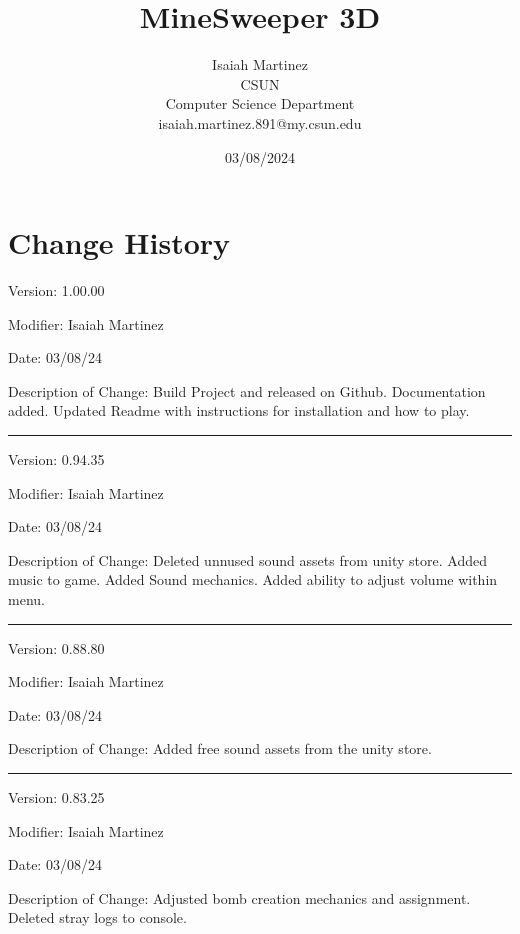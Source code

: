 \documentclass[a4paper,10pt]{article}
\begin{document}
    \title{MineSweeper 3D}

    \author{Isaiah Martinez \\ CSUN \\ Computer Science Department \\ isaiah.martinez.891@my.csun.edu}
          
    \date{03/08/2024}

    \maketitle
   
    \tableofcontents

    \newpage

    \section{Change History}

    Version: 1.00.00

    Modifier: Isaiah Martinez
    
    Date: 03/08/24
    
    Description of Change: Build Project and released on Github.
    Documentation added.
    Updated Readme with instructions for installation and how to play.
 
    \noindent\rule{12cm}{0.4pt}

    Version: 0.94.35

    Modifier: Isaiah Martinez
    
    Date: 03/08/24
    
    Description of Change: Deleted unnused sound assets from unity store.
    Added music to game.
    Added Sound mechanics.
    Added ability to adjust volume within menu.
 
    \noindent\rule{12cm}{0.4pt}

    Version: 0.88.80

    Modifier: Isaiah Martinez
    
    Date: 03/08/24
    
    Description of Change: Added free sound assets from the unity store.
 
    \noindent\rule{12cm}{0.4pt}

    Version: 0.83.25

    Modifier: Isaiah Martinez
    
    Date: 03/08/24
    
    Description of Change: Adjusted bomb creation mechanics and assignment.
    Deleted stray logs to console.
 
\end{document}
